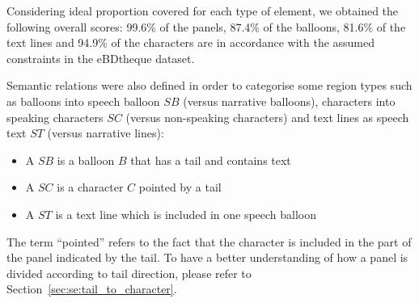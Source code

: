 Considering ideal proportion covered for each type of element, we obtained the following overall scores: 99.6\% of the panels, 87.4\% of the balloons, 81.6\% of the text lines and 94.9\% of the characters are in accordance with the assumed constraints in the eBDtheque dataset.
%

Semantic relations were also defined in order to categorise some region types such as balloons into speech balloon $SB$ (versus narrative balloons), characters into speaking characters $SC$ (versus non-speaking characters) and text lines as speech text $ST$ (versus narrative lines):
\begin{itemize}
  \item A $SB$ is a balloon $B$ that has a tail and contains text
  \item A $SC$ is a character $C$ pointed by a tail
  \item A $ST$ is a text line which is included in one speech balloon
\end{itemize}

The term ``pointed'' refers to the fact that the character is included in the part of the panel indicated by the tail. To have a better understanding of how a panel is divided according to tail direction, please refer to Section~\ref{sec:se:tail_to_character}.



